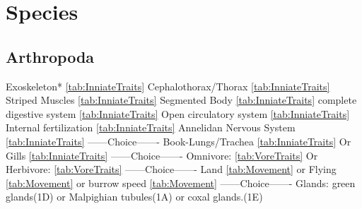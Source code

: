 \chapter{Species}
\label{ch:chapter04}

\section{Arthropoda}
\label{sec:Species:Arthropoda}
Exoskeleton* \ref{tab:InniateTraits}\newline
Cephalothorax/Thorax \ref{tab:InniateTraits}\newline
Striped Muscles \ref{tab:InniateTraits}\newline
Segmented Body \ref{tab:InniateTraits}\newline
complete digestive system \ref{tab:InniateTraits}\newline
Open circulatory system \ref{tab:InniateTraits}\newline
Internal fertilization \ref{tab:InniateTraits}\newline
Annelidan Nervous System \ref{tab:InniateTraits}\newline
------Choice-------\newline
Book-Lungs/Trachea \ref{tab:InniateTraits}\newline
Or\newline
Gills \ref{tab:InniateTraits}\newline
------Choice-------\newline
Omnivore: \ref{tab:VoreTraits}\newline
Or\newline
Herbivore: \ref{tab:VoreTraits}\newline
------Choice-------\newline
Land \ref{tab:Movement}\newline
or\newline
Flying \ref{tab:Movement}\newline
or \newline
burrow speed \ref{tab:Movement}\newline
------Choice-------\newline
Glands: green glands(1D) \newline
or\newline
Malpighian tubules(1A)\newline
or\newline
coxal glands.(1E)\newline